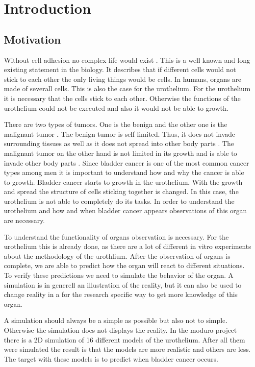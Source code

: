 \chapter{Introduction}
\section{Motivation}
Without cell adhesion no complex life would exist \cite{REF}.
This is a well known and long existing statement in the biology. It describes that if different cells would not stick to each other the only living things would be cells. 
In humans, organs are made of severall cells. This is also the case for the urothelium. For the urothelium it is necessary that the cells stick to each other. Otherwise the functions of the urothelium could not be executed and also it would not be able to growth.%

There are two types of tumors. One is the benign and the other one is the malignant tumor \cite{Poplawski2009}. The benign tumor is self limited. Thus, it does not invade surrounding tissues as well as it does not spread into other body parts \cite{Poplawski2009}. The malignant tumor on the other hand is not limited in its growth and is able to invade other body parts \cite{Poplawski2009}. 
Since bladder cancer is one of the most common cancer types among men it is important to understand how and why the cancer is able to growth. Bladder cancer starts to growth in the urothelium. With the growth and spread the structure of cells sticking together is changed. In this case, the urothelium is not able to completely do its tasks. In order to understand the urothelium and how and when bladder cancer appears observations of this organ are necessary. 

To understand the functionality of organs observation is necessary. For the urothelium this is already done, as there are a lot of different in vitro experiments about the methodology of the urothlium. After the observation of organs is complete, we are able to predict how the organ will react to different situations. To verify these predictions we need to simulate the behavior of the organ. A simulation is in generell an illustration of the reality, but it can also be used to change reality in a for the research specific way to get more knowledge of this organ.

A simulation should always be a simple as possible but also not to simple. Otherwise the simulation does not displays the reality. In the moduro project there is a 2D simulation of 16 different models of the urothelium. After all them were simulated the result is that the models are more realistic and others are less. The target with these models is to predict when bladder cancer occurs.

